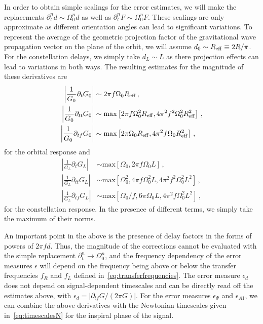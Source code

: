 \documentclass[aps,showpacs,twocolumn,
prd,superscriptaddress,nofootinbib]{revtex4-1}
\begin{document}
In order to obtain simple scalings for the error estimates, we will make the replacements $\partial_{t}^{n} d \sim \Omega_{0}^{n} d$ as well as $\partial_{t}^{n} F \sim \Omega_{0}^{n} F$. These scalings are only approximate as different orientation angles can lead to significant variations. To represent the average of the geometric projection factor of the gravitational wave propagation vector on the plane of the orbit, we will assume $d_{0} \sim R_{\rm eff} \equiv 2R/\pi $. For the constellation delays, we simply take $d_{L} \sim L$ as there projection effects can lead to variations in both ways. The resulting estimates for the magnitude of these derivatives are
\begin{subequations}\label{eq:estimatederivorb}
\begin{align}
	\left| \frac{1}{G_{0}} \partial_{t} G_{0} \right| &\sim 2 \pi f \Omega_{0} R_{\rm eff}\,,\\
	\left| \frac{1}{G_{0}} \partial_{tt} G_{0} \right| &\sim \text{max} \left[ 2 \pi f \Omega_{0}^{2} R_{\rm eff} , 4\pi^{2} f^{2} \Omega_{0}^{2} R_{\rm eff}^{2}\right] \,,\\
	\left| \frac{1}{G_{0}} \partial_{tf} G_{0} \right| &\sim \text{max} \left[ 2 \pi  \Omega_{0} R_{\rm eff}, 4 \pi^{2} f \Omega_{0} R_{\rm eff}^{2} \right] \,,
\end{align}
\end{subequations}
for the orbital response and
\begin{subequations}\label{eq:estimatederivconst}
\begin{align}
	\left| \frac{1}{G_{L}} \partial_{t} G_{L} \right| &\sim \text{max} \left[ \Omega_{0}, 2 \pi f \Omega_{0} L \right] \,,\\
	\left| \frac{1}{G_{L}} \partial_{tt} G_{L} \right| &\sim \text{max} \left[ \Omega_{0}^{2}, 4 \pi f \Omega_{0}^{2} L, 4\pi^{2} f^{2} \Omega_{0}^{2} L^{2} \right] \,,\\
	\left| \frac{1}{G_{L}} \partial_{tf} G_{L} \right| &\sim \text{max} \left[ \Omega_{0}/f, 6 \pi \Omega_{0} L, 4\pi^{2} f \Omega_{0}^{2} L^{2} \right] \,,
\end{align}
\end{subequations}
for the constellation response. In the presence of different terms, we simply take the maximum of their norms.

An important point in the above is the presence of delay factors in the forms of powers of $2\pi f d$. Thus, the magnitude of the corrections cannot be evaluated with the simple replacement $\partial_{t}^{n} \rightarrow \Omega_{0}^{n}$, and the frequency dependency of the error measures $\epsilon$ will depend on the frequency being above or below the transfer frequencies $f_{R}$ and $f_{L}$ defined in~\eqref{eq:transferfrequencies}. The error measure $\epsilon_{d}$ does not depend on signal-dependent timescales and can be directly read off the estimates above, with $\epsilon_{d} = |\partial_{tf}G/(2\pi G)|$. For the error measures $\epsilon_{\Psi}$ and $\epsilon_{A1}$, we can combine the above derivatives with the Newtonian timescales given in~\eqref{eq:timescalesN} for the inspiral phase of the signal.
\end{document}
